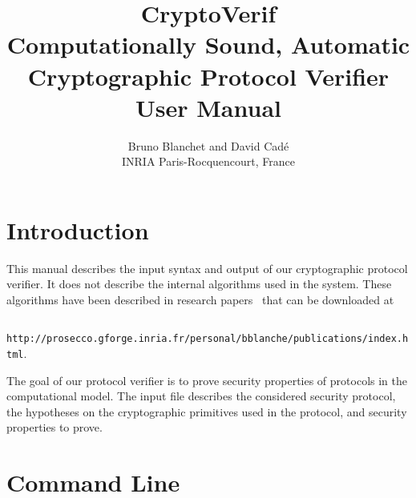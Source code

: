 \documentclass{article}
\begin{document}
\title{CryptoVerif\\
Computationally Sound, Automatic\\
Cryptographic Protocol Verifier\\
User Manual}

\author{Bruno Blanchet and David Cad{\'e}\\
INRIA Paris-Rocquencourt, France}

\maketitle

\section{Introduction}

This manual describes the input syntax and output of our cryptographic
protocol verifier. It does not describe the internal algorithms used
in the system. These algorithms have been described in research
papers~\cite{Blanchet06,BlanchetEPrint05,Blanchet06b,BlanchetPointchevalEPrint06}
that can be downloaded at

\centerline{{\tt
http://prosecco.gforge.inria.fr/personal/bblanche/publications/index.html}.}

The goal of our protocol verifier is to prove security properties
of protocols in the computational model. The input file describes
the considered security protocol, the hypotheses on the cryptographic
primitives used in the protocol, and security properties to prove.

\section{Command Line}
\end{document}
